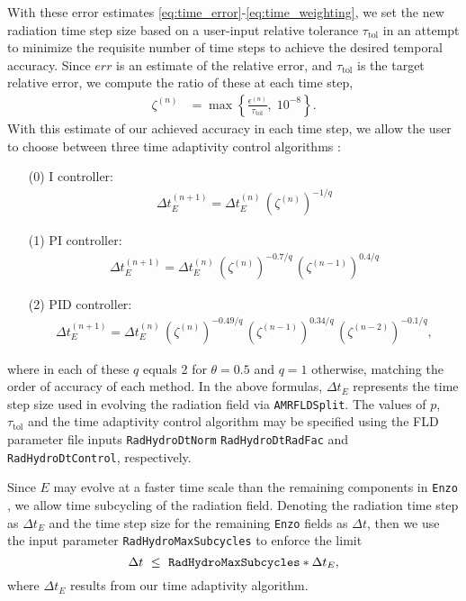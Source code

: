 \documentclass[letterpaper,10pt]{article}
\renewcommand{\(}{\left(}
\renewcommand{\)}{\right)}
\newcommand{\dt}{\Delta t}
\newcommand{\enzo}{{\tt Enzo} }
\begin{document}
With these error estimates
\eqref{eq:time_error}-\eqref{eq:time_weighting}, we set the new
radiation time step size based on a user-input relative tolerance
$\tau_{\text{tol}}$ in an attempt to minimize the requisite number of
time steps to achieve the desired temporal accuracy.  Since $err$ is
an estimate of the relative error, and $\tau_{\text{tol}}$ is the
target relative error, we compute the ratio of these at each time
step,
\begin{align}
  \label{eq:time_weighting}
  \zeta^{(n)} &= \max\left\{\frac{\epsilon^{(n)}}{\tau_{\text{tol}}},\; 10^{-8} \right\}.
\end{align}
With this estimate of our achieved accuracy in each time step, we
allow the user to choose between three time adaptivity control
algorithms \cite{KennedyCarpenter2003}:
\begin{itemize}
\item[(0)] I controller: 
  \begin{align}
    \label{eq:time_estimateI}
    \dt_E^{(n+1)} = \dt_E^{(n)}\, \(\zeta^{(n)}\)^{-1/q}
  \end{align}
\item[(1)] PI controller:
  \begin{align}
    \label{eq:time_estimatePI}
    \dt_E^{(n+1)} = \dt_E^{(n)}\, \(\zeta^{(n)}\)^{-0.7/q}\, \(\zeta^{(n-1)}\)^{0.4/q}
  \end{align}
\item[(2)] PID controller:
  \begin{align}
    \label{eq:time_estimatePID}
    \dt_E^{(n+1)} = \dt_E^{(n)}\, \(\zeta^{(n)}\)^{-0.49/q}\, \(\zeta^{(n-1)}\)^{0.34/q}\, \(\zeta^{(n-2)}\)^{-0.1/q},
  \end{align}
\end{itemize}
where in each of these $q$ equals 2 for $\theta=0.5$ and $q=1$
otherwise, matching the order of accuracy of each method.  In the
above formulas, $\dt_E$ represents the time step size used in evolving
the radiation field via {\tt AMRFLDSplit}.  The values of $p$,
$\tau_{\text{tol}}$ and the time adaptivity control algorithm may be
specified using the FLD parameter file inputs {\tt RadHydroDtNorm} 
{\tt RadHydroDtRadFac} and {\tt RadHydroDtControl}, respectively.

Since $E$ may evolve at a faster time scale than the remaining
components in \enzo, we allow time subcycling of the radiation field.
Denoting the radiation time step as $\dt_{E}$ and the time step size
for the remaining \enzo fields as $\dt$, then we use the input
parameter {\tt RadHydroMaxSubcycles} to enforce the limit
\[
  \dt \ \le \ \text{\tt RadHydroMaxSubcycles} * \dt_E,
\]
where $\dt_E$ results from our time adaptivity algorithm.  
\end{document}
